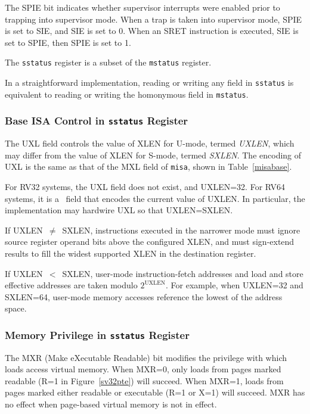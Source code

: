 The SPIE bit indicates whether supervisor interrupts were enabled prior to
trapping into supervisor mode.  When a trap is taken into supervisor
mode, SPIE is set to SIE, and SIE is set to 0.  When an SRET instruction is
executed, SIE is set to SPIE, then SPIE is set to 1.

The {\tt sstatus} register is a subset of the {\tt mstatus} register.

\begin{commentary}
In a straightforward implementation, reading or writing any field in
{\tt sstatus} is equivalent to reading or writing the homonymous field
in {\tt mstatus}.
\end{commentary}

\subsubsection{Base ISA Control in {\tt sstatus} Register}

The UXL field controls the value of XLEN for U-mode, termed {\em UXLEN},
which may differ from the value of XLEN for S-mode, termed {\em SXLEN}.  The
encoding of UXL is the same as that of the MXL field of {\tt misa}, shown in
Table~\ref{misabase}.

For RV32 systems, the UXL field does not exist, and UXLEN=32.  For RV64
systems, it is a \warl\ field that encodes the current value of UXLEN.
In particular, the implementation may hardwire UXL so that UXLEN=SXLEN.

If UXLEN~$\ne$~SXLEN, instructions executed in the narrower mode must ignore
source register operand bits above the configured XLEN, and must sign-extend
results to fill the widest supported XLEN in the destination register.

If UXLEN~$<$~SXLEN, user-mode instruction-fetch addresses and load and store
effective addresses are taken modulo $2^{\text{UXLEN}}$.  For example, when UXLEN=32
and SXLEN=64, user-mode memory accesses reference the lowest 
of the address space.

\subsubsection{Memory Privilege in {\tt sstatus} Register}
\label{sec:sum}

The MXR (Make eXecutable Readable) bit modifies the privilege with which loads
access virtual memory.  When MXR=0, only loads from pages marked readable (R=1
in Figure~\ref{sv32pte}) will succeed.  When MXR=1, loads from pages marked
either readable or executable (R=1 or X=1) will succeed.  MXR has no effect
when page-based virtual memory is not in effect.

